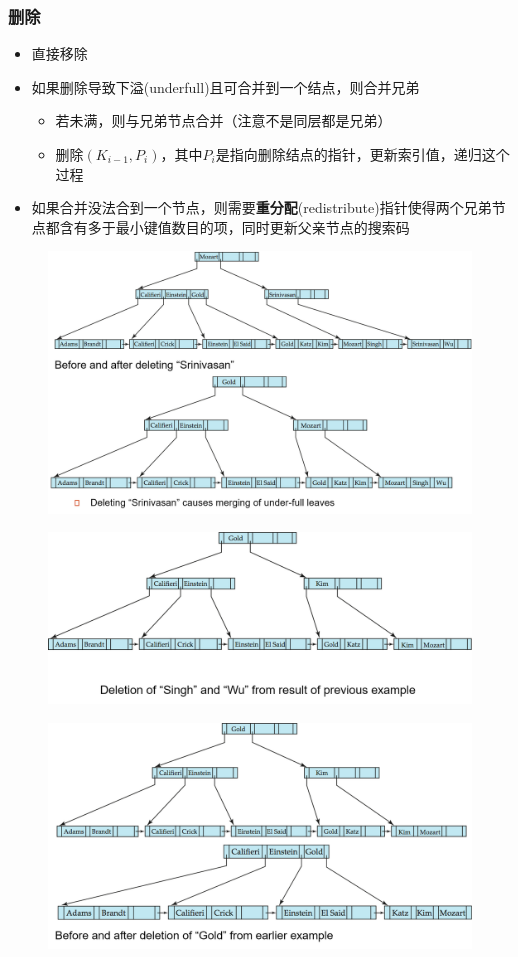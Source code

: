 \subsubsection{删除}
\begin{itemize}
	\item 直接移除
	\item 如果删除导致下溢(underfull)且可合并到一个结点，则合并兄弟
	\begin{itemize}
		\item 若未满，则与兄弟节点合并（注意不是同层都是兄弟）
		\item 删除$(K_{i-1},P_i)$，其中$P_i$是指向删除结点的指针，更新索引值，递归这个过程
	\end{itemize}
	\item 如果合并没法合到一个节点，则需要\textbf{重分配}(redistribute)指针使得两个兄弟节点都含有多于最小键值数目的项，同时更新父亲节点的搜索码
\end{itemize}
\begin{figure}[H]
\centering
\includegraphics[width=0.8\linewidth]{fig/bp-tree_deletion.png}
\end{figure}
\begin{figure}[H]
\centering
\includegraphics[width=0.8\linewidth]{fig/bp-tree_deletion2.png}
\end{figure}
\begin{figure}[H]
\centering
\includegraphics[width=0.8\linewidth]{fig/bp-tree_deletion3.png}
\end{figure}
